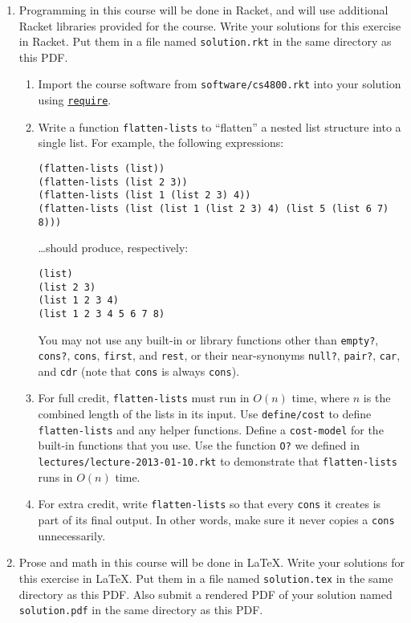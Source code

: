 \documentclass{article}
\begin{document}
\begin{enumerate}
\pagebreak[1]
\item
  Programming in this course will be done in Racket, and will use additional
  Racket libraries provided for the course.  Write your solutions for this
  exercise in Racket.  Put them in a file named \texttt{solution.rkt} in the
  same directory as this PDF.
  \begin{enumerate}
  \item
    Import the course software from \texttt{software/cs4800.rkt} into your
    solution using
    \href{http://docs.racket-lang.org/reference/require.html}{\texttt{require}}.
  \item
    Write a function \texttt{flatten-lists} to ``flatten'' a nested list
    structure into a single list.  For example, the following expressions:
    \begin{verbatim}
(flatten-lists (list))
(flatten-lists (list 2 3))
(flatten-lists (list 1 (list 2 3) 4))
(flatten-lists (list (list 1 (list 2 3) 4) (list 5 (list 6 7) 8))) \end{verbatim}
    \dots should produce, respectively:
    \begin{verbatim}
(list)
(list 2 3)
(list 1 2 3 4)
(list 1 2 3 4 5 6 7 8) \end{verbatim}
    You may not use any built-in or library functions other than
    \texttt{empty?}, \texttt{cons?}, \texttt{cons}, \texttt{first},
    and \texttt{rest}, or their near-synonyms \texttt{null?}, \texttt{pair?}, 
    \texttt{car}, and \texttt{cdr} (note that \texttt{cons} is always
    \texttt{cons}).
  \item
    For full credit, \texttt{flatten-lists} must run in \(O(n)\) time, where
    \(n\) is the combined length of the lists in its input.  Use
    \texttt{define/cost} to define \texttt{flatten-lists} and any helper
    functions.  Define a \texttt{cost-model} for the built-in functions that you
    use.  Use the function \texttt{O?} we defined in
    \texttt{lectures/lecture-2013-01-10.rkt} to demonstrate that
    \texttt{flatten-lists} runs in \(O(n)\) time.
  \item
    For extra credit, write \texttt{flatten-lists} so that every \texttt{cons}
    it creates is part of its final output.  In other words, make sure it never
    copies a \texttt{cons} unnecessarily.
  \end{enumerate}

\pagebreak[1]
\item
  Prose and math in this course will be done in \LaTeX{}.  Write your solutions
  for this exercise in \LaTeX{}.  Put them in a file named \texttt{solution.tex}
  in the same directory as this PDF.  Also submit a rendered PDF of your
  solution named \texttt{solution.pdf} in the same directory as this PDF.


\end{enumerate}
\end{document}
